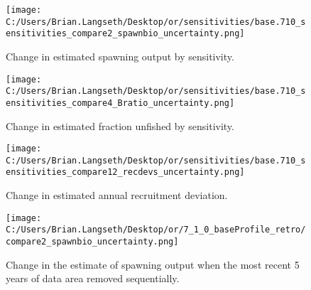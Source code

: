 \documentclass[11pt,
  english,
  a4paper,
]{article}
\begin{document}
\tagmcend\tagstructend


\begin{figure}
\centering
\texttt{[image: C:/Users/Brian.Langseth/Desktop/or/sensitivities/base.710\_sensitivities\_compare2\_spawnbio\_uncertainty.png]}
\caption{Change in estimated spawning output by sensitivity.\label{fig:sens-ssb}}
\end{figure}

\tagmcend\tagstructend


\begin{figure}
\centering
\texttt{[image: C:/Users/Brian.Langseth/Desktop/or/sensitivities/base.710\_sensitivities\_compare4\_Bratio\_uncertainty.png]}
\caption{Change in estimated fraction unfished by sensitivity.\label{fig:sens-depl}}
\end{figure}

\tagmcend\tagstructend


\begin{figure}
\centering
\texttt{[image: C:/Users/Brian.Langseth/Desktop/or/sensitivities/base.710\_sensitivities\_compare12\_recdevs\_uncertainty.png]}
\caption{Change in estimated annual recruitment deviation.\label{fig:sens-recdev}}
\end{figure}

\tagmcend\tagstructend


\begin{figure}
\centering
\texttt{[image: C:/Users/Brian.Langseth/Desktop/or/7\_1\_0\_baseProfile\_retro/compare2\_spawnbio\_uncertainty.png]}
\caption{Change in the estimate of spawning output when the most recent 5 years of data area removed sequentially.\label{fig:retro-ssb}}
\end{figure}

\tagmcend\tagstructend
\end{document}
